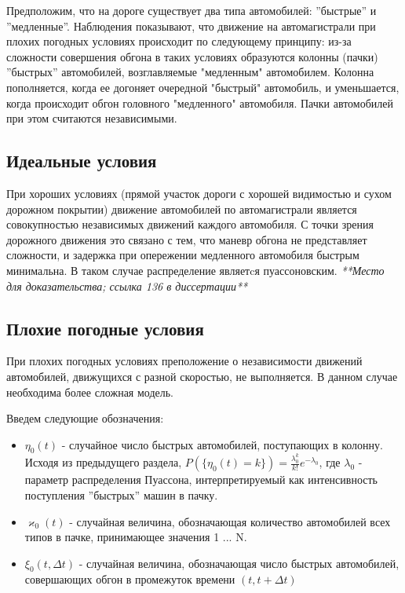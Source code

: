 \documentclass[a4paper, 14pt, russian]{article}
\begin{document}
Предположим, что на дороге существует два типа автомобилей: ''быстрые'' и ''медленные''. Наблюдения показывают, что движение на автомагистрали при плохих погодных условиях происходит по следующему принципу: из-за сложности совершения обгона в таких условиях образуются колонны (пачки) ''быстрых'' автомобилей, возглавляемые "медленным" автомобилем. Колонна пополняется, когда ее догоняет очередной "быстрый" автомобиль, и уменьшается, когда происходит обгон головного "медленного" автомобиля. Пачки автомобилей при этом считаются независимыми.

\subsection{Идеальные условия}
При хороших условиях (прямой участок дороги с хорошей видимостью и сухом дорожном покрытии) движение автомобилей по автомагистрали является совокупностью независимых движений каждого автомобиля. С точки зрения дорожного движения это связано с тем, что маневр обгона не представляет сложности, и задержка при опережении медленного автомобиля быстрым минимальна. В таком случае распределение являетcя пуассоновским.
\textit{**Место для доказательства; ссылка 136 в диссертации**}

\subsection{Плохие погодные условия}
При плохих погодных условиях преположение о независимости движений автомобилей, движущихся с разной скоростью, не выполняется. В данном случае необходима более сложная модель.

Введем следующие обозначения:
\begin{itemize}

\item $\eta_0(t)$ - случайное число быстрых автомобилей, поступающих в колонну. Исходя из предыдущего раздела,
$P(\{\eta_0(t) = k\}) = \frac{\lambda_0^k}{k!}e^{- \lambda_0}$,
где $\lambda_0$ - параметр распределения Пуассона, интерпретируемый как интенсивность поступления ''быстрых'' машин в пачку.

\item $\varkappa_0(t)$ - случайная величина, обозначающая количество автомобилей всех типов в пачке, принимающее значения {1 ... N}.

\item $\xi_0(t, \Delta t)$ - случайная величина, обозначающая число быстрых автомобилей, совершающих обгон в промежуток времени $(t, t + \Delta t)$
\end{itemize}
\end{document}
